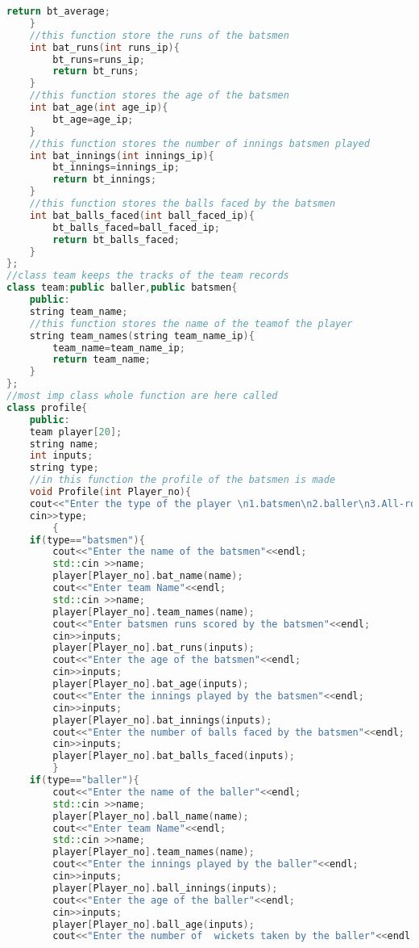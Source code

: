 \documentclass{article}
\begin{document}
\begin{lstlisting}[style=chstyle,language=C++]
        return bt_average;
    }
    //this function store the runs of the batsmen
    int bat_runs(int runs_ip){
        bt_runs=runs_ip;
        return bt_runs;
    }
    //this function stores the age of the batsmen
    int bat_age(int age_ip){
        bt_age=age_ip;
    }
    //this function stores the number of innings batsmen played
    int bat_innings(int innings_ip){
        bt_innings=innings_ip;
        return bt_innings;
    }
    //this function stores the balls faced by the batsmen
    int bat_balls_faced(int ball_faced_ip){
        bt_balls_faced=ball_faced_ip;
        return bt_balls_faced;
    }
};
//class team keeps the tracks of the team records
class team:public baller,public batsmen{
    public:
    string team_name;
    //this function stores the name of the teamof the player
    string team_names(string team_name_ip){
        team_name=team_name_ip;
        return team_name;
    }
};
//most imp class whole function are here called
class profile{
    public:
    team player[20];
    string name;
    int inputs;
    string type;
    //in this function the profile of the batsmen is made
    void Profile(int Player_no){
    cout<<"Enter the type of the player \n1.batsmen\n2.baller\n3.All-rounder\n";
    cin>>type;
        {
    if(type=="batsmen"){
        cout<<"Enter the name of the batsmen"<<endl;
        std::cin >>name;
        player[Player_no].bat_name(name);
        cout<<"Enter team Name"<<endl;
        std::cin >>name;
        player[Player_no].team_names(name);
        cout<<"Enter batsmen runs scored by the batsmen"<<endl;
        cin>>inputs;
        player[Player_no].bat_runs(inputs);
        cout<<"Enter the age of the batsmen"<<endl;
        cin>>inputs;
        player[Player_no].bat_age(inputs);
        cout<<"Enter the innings played by the batsmen"<<endl;
        cin>>inputs;
        player[Player_no].bat_innings(inputs);
        cout<<"Enter the number of balls faced by the batsmen"<<endl;
        cin>>inputs;
        player[Player_no].bat_balls_faced(inputs);
        }
    if(type=="baller"){
        cout<<"Enter the name of the baller"<<endl;
        std::cin >>name;
        player[Player_no].ball_name(name);
        cout<<"Enter team Name"<<endl;
        std::cin >>name;
        player[Player_no].team_names(name);
        cout<<"Enter the innings played by the baller"<<endl;
        cin>>inputs;
        player[Player_no].ball_innings(inputs);
        cout<<"Enter the age of the baller"<<endl;
        cin>>inputs;
        player[Player_no].ball_age(inputs);
        cout<<"Enter the number of  wickets taken by the baller"<<endl;

\end{lstlisting}
\end{document}
